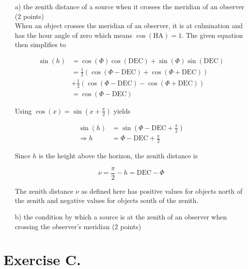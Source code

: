 \documentclass[11pt,a4paper,twoside]{article}
\begin{document}
\begin{enumerate}
 \item[a)] the zenith distance of a source when it crosses the meridian of an observer (2 points) \\
 When an object crosses the meridian of an observer, it is at culmination and has the hour angle of zero which means $\cos{ \left( \text{HA} \right)} = 1$. The given equation then simplifies to 
 
 \begin{align}
  \sin{ \left( h \right)} &= \cos{ \left( \Phi \right)} \cos{ \left( \text{DEC} \right)} + \sin{ \left( \Phi \right)} \sin{ \left( \text{DEC} \right)} \\
  &= \frac{1}{2} \left( \cos{ \left( \Phi - \text{DEC} \right)} + \cos{ \left( \Phi + \text{DEC} \right)} \right) \\ &+ \frac{1}{2} \left( \cos{ \left( \Phi - \text{DEC} \right)} - \cos{ \left( \Phi + \text{DEC} \right)} \right) \\
  &= \cos{ \left( \Phi - \text{DEC} \right)}
 \end{align}
  
 Using $\cos{ \left( x \right)} = \sin{ \left( x + \frac{\pi}{2} \right)}$ yields 
  
 \begin{align}
  \sin{ \left( h \right)} &= \sin{ \left( \Phi - \text{DEC} + \frac{\pi}{2} \right)} \\
  \Rightarrow h &= \Phi - \text{DEC} + \frac{\pi}{2}
 \end{align}
  
 Since $h$ is the height above the horizon, the zenith distance is 
  
 \begin{equation}
  \nu = \frac{\pi}{2} - h = \text{DEC} - \Phi
 \end{equation}
  
 The zenith distance $\nu$ as defined here has positive values for objects north of the zenith and negative values for objects south of the zenith. \\
 
 \item[b)] the condition by which a source is at the zenith of an observer when crossing the observer's meridian (2 points) \\
 
 

\end{enumerate}

\section*{Exercise C.}
\end{document}
